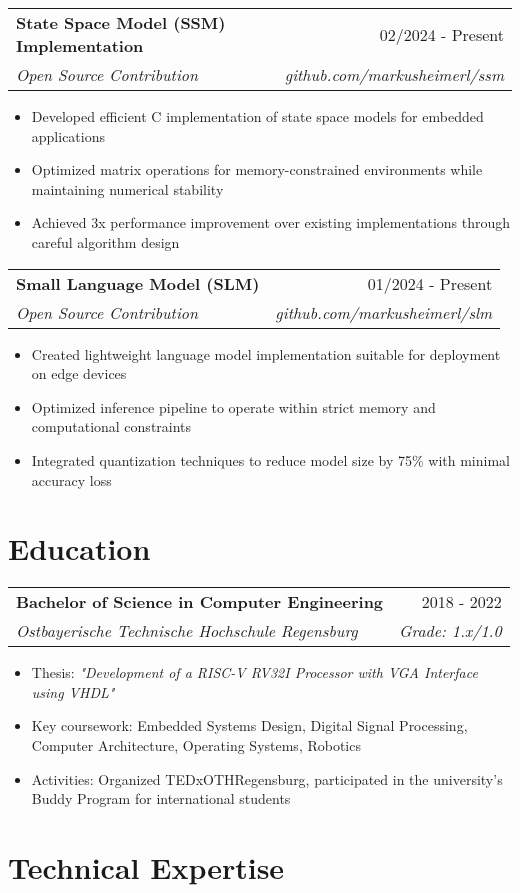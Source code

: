 \documentclass[letterpaper,11pt]{article}
\makeatletter
\newcommand{\entryspace}{\vspace{0.2em}}
\newcommand{\cventry}[4]{
  \begin{tabular*}{\textwidth}{l@{\extracolsep{\fill}}r}
    \textbf{#1} & \textcolor{secondary}{#2} \\
    \textcolor{accent}{\textit{#3}} & \textcolor{secondary}{\textit{#4}} \\
  \end{tabular*}\entryspace
}
\makeatother
\begin{document}
\cventry{State Space Model (SSM) Implementation}{02/2024 - Present}
{Open Source Contribution}{github.com/markusheimerl/ssm}
\begin{itemize}[leftmargin=*, nosep]
    \item Developed efficient C implementation of state space models for embedded applications
    \item Optimized matrix operations for memory-constrained environments while maintaining numerical stability
    \item Achieved 3x performance improvement over existing implementations through careful algorithm design
\end{itemize}

\cventry{Small Language Model (SLM)}{01/2024 - Present}
{Open Source Contribution}{github.com/markusheimerl/slm}
\begin{itemize}[leftmargin=*, nosep]
    \item Created lightweight language model implementation suitable for deployment on edge devices
    \item Optimized inference pipeline to operate within strict memory and computational constraints
    \item Integrated quantization techniques to reduce model size by 75\% with minimal accuracy loss
\end{itemize}

\section{Education}

\cventry{Bachelor of Science in Computer Engineering}{2018 - 2022}
{Ostbayerische Technische Hochschule Regensburg}{Grade: 1.x/1.0}
\begin{itemize}[leftmargin=*, nosep]
    \item Thesis: \textit{"Development of a RISC-V RV32I Processor with VGA Interface using VHDL"}
    \item Key coursework: Embedded Systems Design, Digital Signal Processing, Computer Architecture, Operating Systems, Robotics
    \item Activities: Organized TEDxOTHRegensburg, participated in the university's Buddy Program for international students
\end{itemize}

\section{Technical Expertise}
\end{document}
